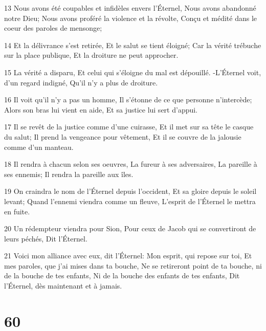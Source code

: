 \par 13 Nous avons été coupables et infidèles envers l'Éternel, Nous avons abandonné notre Dieu; Nous avons proféré la violence et la révolte, Conçu et médité dans le coeur des paroles de mensonge;
\par 14 Et la délivrance s'est retirée, Et le salut se tient éloigné; Car la vérité trébuche sur la place publique, Et la droiture ne peut approcher.
\par 15 La vérité a disparu, Et celui qui s'éloigne du mal est dépouillé. -L'Éternel voit, d'un regard indigné, Qu'il n'y a plus de droiture.
\par 16 Il voit qu'il n'y a pas un homme, Il s'étonne de ce que personne n'intercède; Alors son bras lui vient en aide, Et sa justice lui sert d'appui.
\par 17 Il se revêt de la justice comme d'une cuirasse, Et il met sur sa tête le casque du salut; Il prend la vengeance pour vêtement, Et il se couvre de la jalousie comme d'un manteau.
\par 18 Il rendra à chacun selon ses oeuvres, La fureur à ses adversaires, La pareille à ses ennemis; Il rendra la pareille aux îles.
\par 19 On craindra le nom de l'Éternel depuis l'occident, Et sa gloire depuis le soleil levant; Quand l'ennemi viendra comme un fleuve, L'esprit de l'Éternel le mettra en fuite.
\par 20 Un rédempteur viendra pour Sion, Pour ceux de Jacob qui se convertiront de leurs péchés, Dit l'Éternel.
\par 21 Voici mon alliance avec eux, dit l'Éternel: Mon esprit, qui repose sur toi, Et mes paroles, que j'ai mises dans ta bouche, Ne se retireront point de ta bouche, ni de la bouche de tes enfants, Ni de la bouche des enfants de tes enfants, Dit l'Éternel, dès maintenant et à jamais.

\chapter{60}

